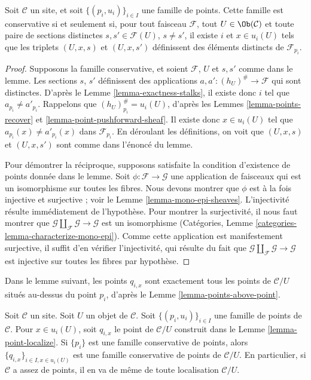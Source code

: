 \begin{lemma}
\label{lemma-enough}
Soit $\mathcal{C}$ un site, et soit $\{(p_i, u_i)\}_{i\in I}$ une
famille de points. Cette famille est conservative si et seulement si, pour tout
faisceau $\mathcal{F}$, tout $U\in \Ob(\mathcal{C})$ et toute
paire de sections distinctes $s, s' \in \mathcal{F}(U)$, $s \not = s'$, il
existe $i$ et $x\in u_i(U)$ tels que les triplets
$(U, x, s)$ et $(U, x, s')$ définissent des éléments distincts de
$\mathcal{F}_{p_i}$.
\end{lemma}

\begin{proof}
Supposons la famille conservative, et soient $\mathcal{F}$, $U$ et
$s, s'$ comme dans le lemme. Les sections $s$, $s'$ définissent des applications
$a, a' : (h_U)^\# \to \mathcal{F}$ qui sont distinctes. D’après le Lemme
\ref{lemma-exactness-stalks}, il existe donc $i$ tel que $a_{p_i}
\not = a'_{p_i}$. Rappelons que $(h_U)^\#_{p_i} = u_i(U)$, d’après les
Lemmes \ref{lemma-points-recover} et
\ref{lemma-point-pushforward-sheaf}.
Il existe donc $x \in u_i(U)$ tel que $a_{p_i}(x)
\not = a'_{p_i}(x)$ dans $\mathcal{F}_{p_i}$.
En déroulant les définitions, on voit que $(U, x, s)$
et $(U, x, s')$ sont comme dans l’énoncé du lemme.

\medskip\noindent
Pour démontrer la réciproque, supposons satisfaite la condition d’existence de
points donnée dans le lemme. Soit $\phi : \mathcal{F} \to \mathcal{G}$
une application de faisceaux qui est un isomorphisme sur toutes les fibres.
Nous devons montrer que $\phi$ est à la fois
injective et surjective ; voir le Lemme \ref{lemma-mono-epi-sheaves}.
L’injectivité résulte immédiatement de l’hypothèse.
Pour montrer la surjectivité, il nous faut montrer que
$\mathcal{G} \amalg_\mathcal{F} \mathcal{G} \to \mathcal{G}$
est un isomorphisme
(Catégories, Lemme \ref{categories-lemma-characterize-mono-epi}).
Comme cette application est manifestement surjective, il suffit d’en vérifier l’injectivité,
qui résulte du fait que $\mathcal{G} \amalg_\mathcal{F} \mathcal{G} \to \mathcal{G}$
est injective sur toutes les fibres par hypothèse.
\end{proof}

\noindent
Dans le lemme suivant, les points $q_{i, x}$ sont exactement tous les points
de $\mathcal{C}/U$ situés au-dessus du point $p_i$, d’après le
Lemme \ref{lemma-points-above-point}.

\begin{lemma}
\label{lemma-localize-enough}
Soit $\mathcal{C}$ un site. Soit $U$ un objet de $\mathcal{C}$.
Soit $\{(p_i, u_i)\}_{i\in I}$ une famille de points de $\mathcal{C}$.
Pour $x \in u_i(U)$, soit $q_{i, x}$ le point de $\mathcal{C}/U$
construit dans le
Lemme \ref{lemma-point-localize}.
Si $\{p_i\}$ est une famille conservative de points, alors
$\{q_{i, x}\}_{i \in I, x \in u_i(U)}$ est une famille conservative
de points de $\mathcal{C}/U$.
En particulier, si $\mathcal{C}$ a assez de points, il en va de même
de toute localisation $\mathcal{C}/U$.
\end{lemma}

